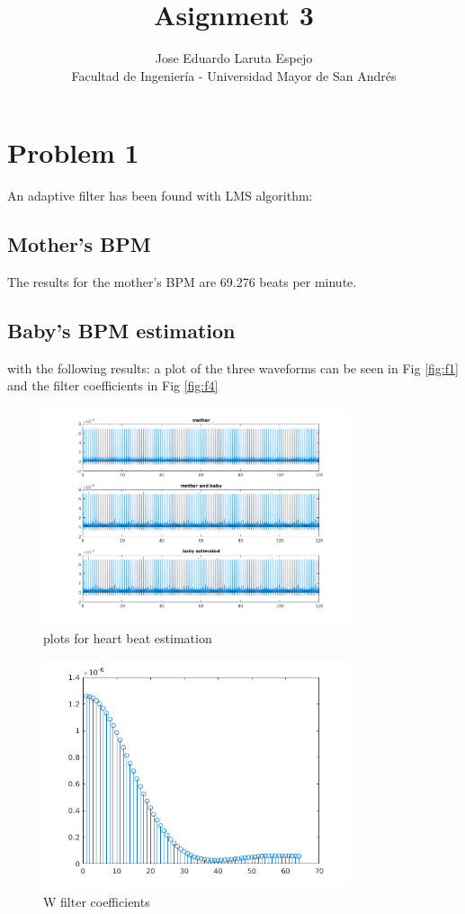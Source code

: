 \documentclass[12pt,letterpaper]{article}
\title{Asignment 3}
\author{Jose Eduardo Laruta Espejo \\ Facultad de Ingeniería - Universidad Mayor de San Andrés}
\begin{document}
\maketitle
\section{Problem 1}
An adaptive filter has been found with LMS algorithm:


\subsection{Mother's BPM}
The results for the mother's BPM are 69.276 beats per minute.

\subsection{Baby's BPM estimation}

with the following results: a plot of the three waveforms can be seen in Fig \ref{fig:f1} and the filter coefficients in Fig \ref{fig:f4}
\begin{figure}[!h] 
  \centering
  \includegraphics[width=0.8\textwidth]{../matlab/img/res.png}
  \caption{plots for heart beat estimation}
  \label{fig:res}
\end{figure}
\begin{figure}[!h] 
  \centering
  \includegraphics[width=0.8\textwidth]{../matlab/img/w.png}
  \caption{W filter coefficients}
  \label{fig:res}
\end{figure}
\end{document}
